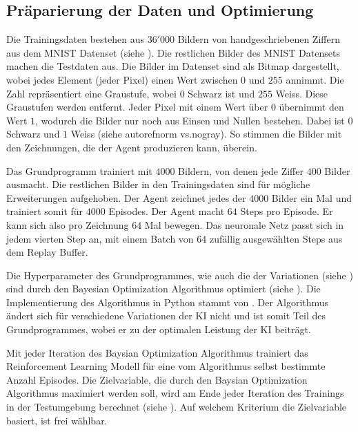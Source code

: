 \subsection{Präparierung der Daten und Optimierung}\label{sub:m_grund_data}
Die Trainingsdaten bestehen aus $36'000$ Bildern von handgeschriebenen Ziffern
aus dem MNIST Datenset (siehe ). Die restlichen Bilder des
MNIST Datensets machen die Testdaten aus. Die Bilder im Datenset sind als Bitmap
dargestellt, wobei jedes Element (jeder Pixel) einen Wert zwischen $0$ und $255$
annimmt. Die Zahl repräsentiert eine Graustufe, wobei $0$ Schwarz ist und $255$
Weiss. Diese Graustufen werden entfernt. Jeder Pixel mit einem Wert über $0$
übernimmt den Wert $1$, wodurch die Bilder nur noch aus Einsen und Nullen
bestehen. Dabei ist $0$ Schwarz und $1$ Weiss (siehe autoref{norm vs.nogray}).
So stimmen die Bilder mit den Zeichnungen, die der Agent produzieren kann,
überein.


Das Grundprogramm trainiert mit $4000$ Bildern, von denen jede Ziffer $400$
Bilder ausmacht. Die restlichen Bilder in den Trainingsdaten sind für mögliche  
Erweiterungen aufgehoben. Der Agent zeichnet jedes der $4000$ Bilder ein Mal und
trainiert somit für $4000$ Episodes. Der Agent macht $64$ Steps pro Episode. Er
kann sich also pro Zeichnung $64$ Mal bewegen. Das neuronale Netz passt sich in
jedem vierten Step an, mit einem Batch von $64$ zufällig ausgewählten Steps aus
dem Replay Buffer.

Die Hyperparameter des Grundprogrammes, wie auch die der Variationen (siehe
) sind durch den Bayesian Optimization Algorithmus optimiert
(siehe ). Die Implementierung des Algorithmus in Python
stammt von \cite{fernando_nogueira_bayesian_2014}. Der Algorithmus ändert sich für
verschiedene Variationen der KI nicht und ist somit Teil des Grundprogrammes,
wobei er zu der optimalen Leistung der KI beiträgt. 

Mit jeder Iteration des Baysian Optimization Algorithmus trainiert das
Reinforcement Learning Modell für eine vom Algorithmus selbst bestimmte Anzahl
Episodes. Die Zielvariable, die durch den Baysian Optimization Algorithmus
maximiert werden soll, wird am Ende jeder Iteration des Trainings in der
Testumgebung berechnet (siehe ). Auf welchem
Kriterium die Zielvariable basiert, ist frei wählbar.



